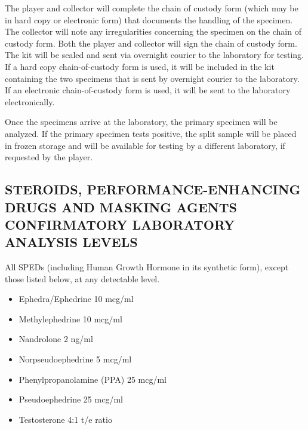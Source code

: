 \documentclass[
]{book}
\providecommand{\tightlist}{%
  \setlength{\itemsep}{0pt}\setlength{\parskip}{0pt}}
\begin{document}
The player and collector will complete the chain of custody form (which may be in hard copy or electronic form) that documents the handling of the specimen. The collector will note any irregularities concerning the specimen on the chain of custody form. Both the player and collector will sign the chain of custody form. The kit will be sealed and sent via overnight courier to the laboratory for testing. If a hard copy chain-of-custody form is used, it will be included in the kit containing the two specimens that is sent by overnight courier to the laboratory. If an electronic chain-of-custody form is used, it will be sent to the laboratory electronically.

Once the specimens arrive at the laboratory, the primary specimen will be analyzed. If the primary specimen tests positive, the split sample will be placed in frozen storage and will be available for testing by a different laboratory, if requested by the player.

\hypertarget{steroids-performance-enhancing-drugs-and-masking-agents-confirmatory-laboratory-analysis-levels}{%
\section{STEROIDS, PERFORMANCE-ENHANCING DRUGS AND MASKING AGENTS CONFIRMATORY LABORATORY ANALYSIS LEVELS}\label{steroids-performance-enhancing-drugs-and-masking-agents-confirmatory-laboratory-analysis-levels}}

All SPEDs (including Human Growth Hormone in its synthetic form), except those listed below, at any detectable level.

\begin{itemize}
\tightlist
\item
  Ephedra/Ephedrine 10 mcg/ml
\item
  Methylephedrine 10 mcg/ml
\item
  Nandrolone 2 ng/ml
\item
  Norpseudoephedrine 5 mcg/ml
\item
  Phenylpropanolamine (PPA) 25 mcg/ml
\item
  Pseudoephedrine 25 mcg/ml
\item
  Testosterone 4:1 t/e ratio
\end{itemize}

\hypertarget{section-1}{%
\chapter{}\label{section-1}}
\end{document}
